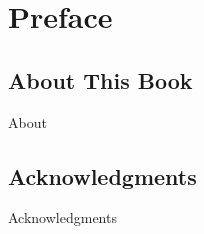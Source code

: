 \pagebreak
\chapter*{Preface}
\vspace{5mm}

\section{About This Book}

\justifying
About

\section{Acknowledgments}

\justifying
Acknowledgments
